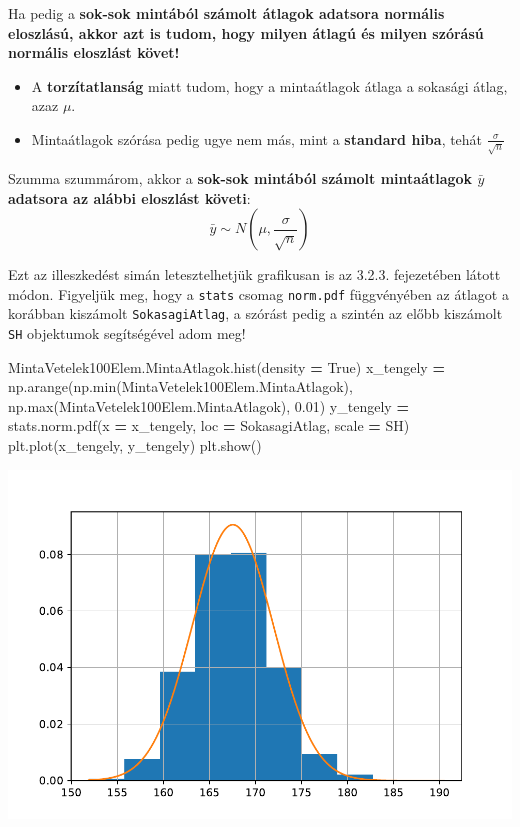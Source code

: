 \documentclass[
]{book}
\newenvironment{Shaded}{\begin{snugshade}}{\end{snugshade}}
\newcommand{\BuiltInTok}[1]{#1}
\newcommand{\FloatTok}[1]{\textcolor[rgb]{0.00,0.00,0.81}{#1}}
\newcommand{\NormalTok}[1]{#1}
\newcommand{\OperatorTok}[1]{\textcolor[rgb]{0.81,0.36,0.00}{\textbf{#1}}}
\newcommand{\VariableTok}[1]{\textcolor[rgb]{0.00,0.00,0.00}{#1}}
\providecommand{\tightlist}{%
  \setlength{\itemsep}{0pt}\setlength{\parskip}{0pt}}
\begin{document}
Ha pedig a \textbf{sok-sok mintából számolt átlagok adatsora normális eloszlású, akkor azt is tudom, hogy milyen átlagú és milyen szórású normális eloszlást követ!}

\begin{itemize}
\tightlist
\item
  A \textbf{torzítatlanság} miatt tudom, hogy a mintaátlagok átlaga a sokasági átlag, azaz \(\mu\).
\item
  Mintaátlagok szórása pedig ugye nem más, mint a \textbf{standard hiba}, tehát \(\frac{\sigma}{\sqrt{n}}\)
\end{itemize}

Szumma szummárom, akkor a \textbf{sok-sok mintából számolt mintaátlagok \(\bar{y}\) adatsora az alábbi eloszlást követi}: \[\bar{y} \sim N\left(\mu,\frac{\sigma}{\sqrt{n}}\right)\]

Ezt az illeszkedést simán letesztelhetjük grafikusan is az 3.2.3. fejezetében látott módon.
Figyeljük meg, hogy a \texttt{stats} csomag \texttt{norm.pdf} függvényében az átlagot a korábban kiszámolt \texttt{SokasagiAtlag}, a szórást pedig a szintén az előbb kiszámolt \texttt{SH} objektumok segítségével adom meg!

\begin{Shaded}
\begin{Highlighting}[]
\NormalTok{MintaVetelek100Elem.MintaAtlagok.hist(density }\OperatorTok{=} \VariableTok{True}\NormalTok{)}
\NormalTok{x\_tengely }\OperatorTok{=}\NormalTok{ np.arange(np.}\BuiltInTok{min}\NormalTok{(MintaVetelek100Elem.MintaAtlagok), np.}\BuiltInTok{max}\NormalTok{(MintaVetelek100Elem.MintaAtlagok), }\FloatTok{0.01}\NormalTok{)}
\NormalTok{y\_tengely }\OperatorTok{=}\NormalTok{ stats.norm.pdf(x }\OperatorTok{=}\NormalTok{ x\_tengely, loc }\OperatorTok{=}\NormalTok{ SokasagiAtlag, scale }\OperatorTok{=}\NormalTok{ SH)}
\NormalTok{plt.plot(x\_tengely, y\_tengely)}
\NormalTok{plt.show()}
\end{Highlighting}
\end{Shaded}

\includegraphics{_main_files/figure-latex/unnamed-chunk-260-7.pdf}
\end{document}
